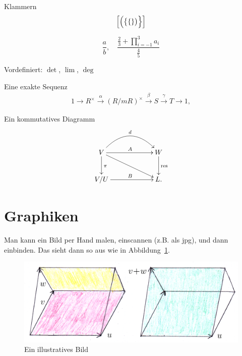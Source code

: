 \documentclass[a4paper,11pt]{article}
\theoremstyle{definition}
\theoremstyle{plain}
\begin{document}
Klammern $$\left [ \Bigl( \bigl\{ \{ \} \bigr) \Bigr\} \right ] $$

\medskip

\noindent
$$\frac{a}{b}, \quad \frac{ \frac{2}{3} + \prod_{i=-1}^3 a_i}{ \frac{4}{5} }$$


\medskip

\noindent
Vordefiniert: $\det$, $\lim$, $\deg$


\medskip

\noindent
Eine exakte Sequenz
\begin{align} \label{eq::raycl} 
1 \longrightarrow R^\times \overset{\alpha}{\longrightarrow} (R
/ m R)^\times \overset{\beta}{\longrightarrow} S
\overset{\gamma}{\longrightarrow} T \longrightarrow 1,
\end{align}

\medskip

\noindent
Ein kommutatives Diagramm
\begin{align}\label{diag::ar}\begin{gathered}
\xymatrixcolsep{5pc}\xymatrixrowsep{2pc}\xymatrix{ 
  V \ar[r]^{A} \ar[d]^{\pi} \ar[dr] \ar@/^2pc/[r]^{d}  & W \ar[d]^{\text{res}} \\
  V/U \ar[r]^{B} & L. }
\end{gathered}\end{align}

\section{Graphiken}
\label{sectiong}

Man kann ein Bild per Hand malen, einscannen (z.B. als jpg), und dann
einbinden. Das sieht dann so aus wie in Abbildung~\ref{fig::eins}.

\begin{figure}[h] \label{fig::eins}
\begin{center}
\includegraphics[scale=0.6]{voladd.png}
\end{center}
\caption{Ein illustratives Bild}
\end{figure}
\end{document}

